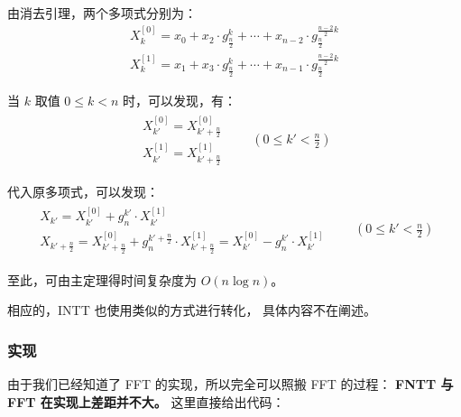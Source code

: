 \documentclass[12pt, UTF8]{article}
\begin{document}
    由消去引理，两个多项式分别为：
    \begin{gather*}
        X_k^{[0]} = x_0 + x_2 · g_{\frac {n}{2}}^{k} + \cdots
        + x_{n - 2} · g_{\frac {n}{2}}^{\frac {n - 2} {2} k}
        \\
        X_k^{[1]} = x_1 + x_3 · g_{\frac {n}{2}}^{k} + \cdots
        + x_{n - 1} · g_{\frac {n}{2}}^{\frac {n - 2} {2} k}
    \end{gather*}

    当 $k$ 取值 $0 \le k < n$ 时，可以发现，有：
    \begin{gather*}
        \begin{matrix}
            X_{k'}^{[0]} = X_{k' + \frac {n} {2}}^{[0]}
            \\
            X_{k'}^{[1]} = X_{k' + \frac {n} {2}}^{[1]}
        \end{matrix}
        \qquad
        (0 \le k' < \frac {n} {2})
    \end{gather*}

    代入原多项式，可以发现：
    \begin{gather*}
        \begin{matrix}
            X_{k'} = X_{k'}^{[0]} + g_n^{k'} · X_{k'}^{[1]}
            \\
            X_{k' + \frac {n} {2}}
            = X_{k' + \frac {n} {2}}^{[0]} +
            g_n^{k' + \frac {n} {2}} · X_{k' + \frac {n} {2}}^{[1]}
            = X_{k'}^{[0]} - g_n^{k'} · X_{k'}^{[1]}
        \end{matrix}
        \qquad
        (0 \le k' < \frac {n} {2})
    \end{gather*}

    至此，可由主定理得时间复杂度为 $O(n \log n)$。

    \bigskip
    相应的，INTT 也使用类似的方式进行转化，
    具体内容不在阐述。

    \subsubsection{实现}
    由于我们已经知道了 FFT 的实现，所以完全可以照搬 FFT 的过程：
    \textbf{FNTT 与 FFT 在实现上差距并不大。}
    这里直接给出代码：
\end{document}
